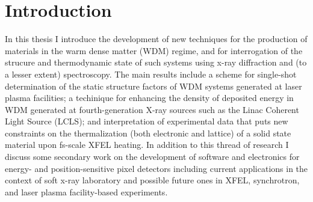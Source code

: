 \documentclass [11pt, proquest, article] {uwthesis}[2016/11/22]
\begin{document}
% 
% 

%
%

%
 
 
 
%
%

\textpages
 
 
\chapter {Introduction}
 
In this thesis I introduce the development of new techniques for the production of materials in the warm dense matter (WDM) regime, and for interrogation of the strucure and thermodynamic state of such systems using x-ray diffraction and (to a lesser extent) spectroscopy. The main results include a scheme for single-shot determination of the static structure factors of WDM systems generated at laser plasma facilities; a techinique for enhancing the density of deposited energy in WDM generated at fourth-generation X-ray sources such as the Linac Coherent Light Source (LCLS); and interpretation of experimental data that puts new constraints on the thermalization (both electronic and lattice) of a solid state material upon fs-scale XFEL heating. In addition to this thread of research I discuss some secondary work on the development of software and electronics for energy- and position-sensitive pixel detectors including current applications in the context of soft x-ray laboratory and possible future ones in XFEL, synchrotron, and laser plasma facility-based experiments.
\end{document}
